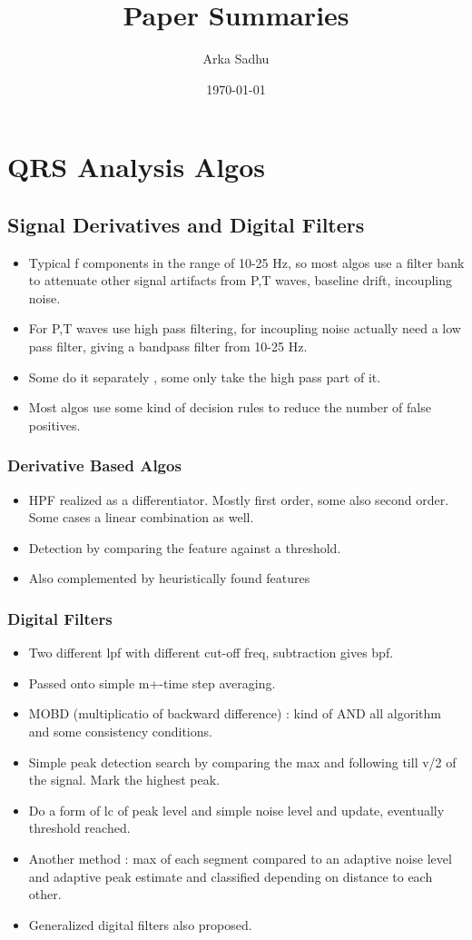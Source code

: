 \documentclass{article}
\title{Paper Summaries}
\author{
  Arka Sadhu}
\date{\today}
\begin{document}
\maketitle

\tableofcontents
\newpage

\section{QRS Analysis Algos}
\subsection{Signal Derivatives and Digital Filters}
\begin{itemize}
\item Typical f components in the range of 10-25 Hz, so most algos use a filter bank to attenuate other signal artifacts from P,T waves, baseline drift, incoupling noise.
\item For P,T waves use high pass filtering, for incoupling noise actually need a low pass filter, giving a bandpass filter from 10-25 Hz.
\item Some do it separately , some only take the high pass part of it.
\item Most algos use some kind of decision rules to reduce the number of false positives.
\end{itemize}
\subsubsection{Derivative Based Algos}
\begin{itemize}
\item HPF realized as a differentiator. Mostly first order, some also second order. Some cases a linear combination as well.
\item Detection by comparing the feature against a threshold.
\item Also complemented by heuristically found features
\end{itemize}
\subsubsection{Digital Filters}
\begin{itemize}
\item Two different lpf with different cut-off freq, subtraction gives bpf.
\item Passed onto simple m+-time step averaging.
\item MOBD (multiplicatio of backward difference) : kind of AND all algorithm  and some consistency conditions.
\item Simple peak detection search by comparing the max and following till v/2 of the signal. Mark the highest peak.
\item Do a form of lc of peak level and simple noise level and update, eventually threshold reached.
\item Another method : max of each segment compared to an adaptive noise level and adaptive peak estimate and classified depending on distance to each other.
\item Generalized digital filters also proposed.
\end{itemize}
\end{document}
